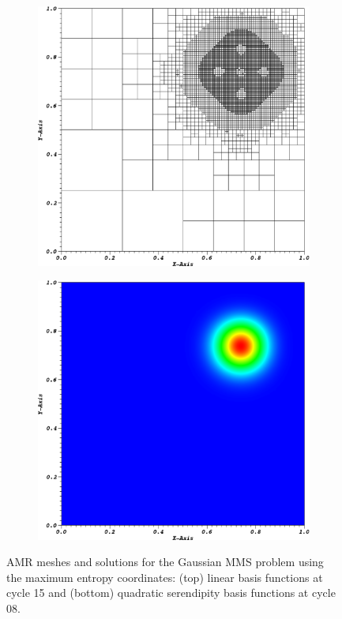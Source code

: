 \begin{figure}
{\begin{subfigure}[b]{0.485\textwidth}
	\end{subfigure}
}
\vspace{1cm}
{
	\begin{subfigure}[b]{0.485\textwidth}
		\centering
		\label{subfig::AMR_GQ_ME2_mesh}
		\includegraphics[width=\textwidth]{figures/sec_BF/ME2_cart_Irr=1_cyc08_mesh.eps}
	\end{subfigure}
	\hfill
	\begin{subfigure}[b]{0.485\textwidth}
		\centering
		\label{subfig::AMR_GQ_ME2_sol}
		\includegraphics[width=\textwidth]{figures/sec_BF/ME2_cart_Irr=1_cyc08_sol.eps}
	\end{subfigure}
}
\caption{AMR meshes and solutions for the Gaussian MMS problem using the maximum entropy coordinates: (top) linear basis functions at cycle 15 and (bottom) quadratic serendipity basis functions at cycle 08.}
\label{fig::BF_Results_MMS_GQ_AMR_MeshSol}
\end{figure}
